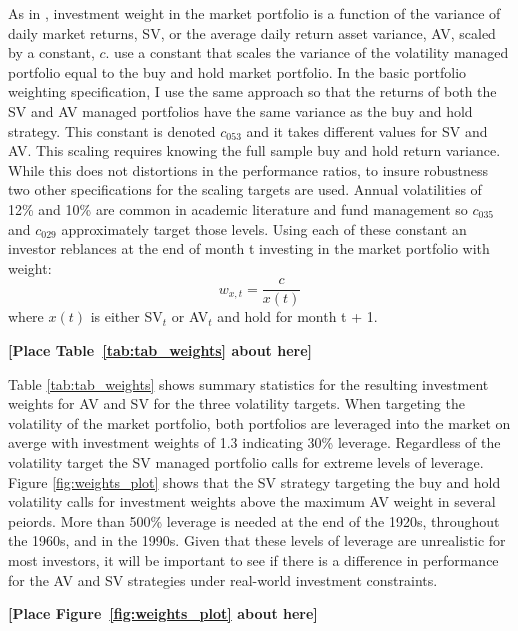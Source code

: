 As in \citet{moreira_volatility-managed_2017}, investment weight in the market portfolio is a function of the variance of daily market returns, SV, or the average daily return asset variance, AV, scaled by a constant, $c$. \citet{moreira_volatility-managed_2017} use a constant that scales the variance of the volatility managed portfolio equal to the buy and hold market portfolio. In the basic portfolio weighting specification, I use the same approach so that the returns of both the SV and AV managed portfolios have the same variance as the buy and hold strategy. This constant is denoted $c_{053}$ and it takes different values for SV and AV. This scaling requires knowing the full sample buy and hold return variance. While this does not distortions in the performance ratios, to insure robustness two other specifications for the scaling targets are used. Annual volatilities of 12\% and 10\% are common in academic literature and fund management so $c_{035}$ and $c_{029}$ approximately target those levels. \citet{barroso_momentum_2015,morrison_guarantees_nodate,verma_volatility-targeting_2018,fleming_economic_nodate,hocquard_constant-volatility_2013} Using each of these constant an investor reblances at the end of month t investing in the market portfolio with weight:
\begin{equation}
	w_{x,t} = \frac{c}{x(t)}
\end{equation} where $x(t)$ is either SV$_{t}$ or AV$_{t}$ and hold for month t + 1. 

\bigskip
\centerline{\bf [Place Table~\ref{tab:tab_weights} about here]}
\bigskip
Table \ref{tab:tab_weights} shows summary statistics for the resulting investment weights for AV and SV for the three volatility targets. When targeting the volatility of the market portfolio, both portfolios are leveraged into the market on averge with investment weights of 1.3 indicating 30\% leverage. Regardless of the volatility target the SV managed portfolio calls for extreme levels of leverage. Figure \ref{fig:weights_plot} shows that the SV strategy targeting the buy and hold volatility calls for investment weights above the maximum AV weight in several peiords. More than 500\% leverage is needed at the end of the 1920s, throughout the 1960s, and in the 1990s. Given that these levels of leverage are unrealistic for most investors, it will be important to see if there is a difference in performance for the AV and SV strategies under real-world investment constraints.
\bigskip
\centerline{\bf [Place Figure~\ref{fig:weights_plot} about here]}
\bigskip
